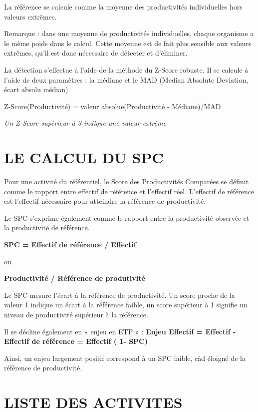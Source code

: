 \documentclass[
]{book}
\begin{document}
La référence se calcule comme la moyenne des productivités individuelles hors valeurs extrêmes.

Remarque : dans une moyenne de productivités individuelles, chaque organisme a le même poids dans le calcul. Cette moyenne est de fait plus sensible aux valeurs extrêmes, qu'il est donc nécessaire de détecter et d'éliminer.

La détection s'effectue à l'aide de la méthode du Z-Score robuste.
Il se calcule à l'aide de deux paramètres : la médiane et le MAD (Median Absolute Deviation, écart absolu médian).

Z-Score(Productivité) = valeur absolue(Productivité - Médiane)/MAD

\emph{Un Z-Score supérieur à 3 indique une valeur extrême}

\hypertarget{le-calcul-du-spc-5}{%
\section{LE CALCUL DU SPC}\label{le-calcul-du-spc-5}}

Pour une activité du référentiel, le Score des Productivités Comparées se définit comme le rapport entre effectif de référence et l'effectif réel. L'effectif de référence est l'effectif nécessaire pour atteindre la référence de productivité.

Le SPC s'exprime également comme le rapport entre la productivité observée et la productivité de référence.

\textbf{SPC = Effectif de référence / Effectif}

ou

\textbf{Productivité / Référence de produtivité}

Le SPC mesure l'écart à la référence de productivité. Un score proche de la valeur 1 indique un écart à la référence faible, un score supérieur à 1 signifie un niveau de productivité supérieur à la référence.

Il se décline également en « enjeu en ETP » :
\textbf{Enjeu Effectif = Effectif - Effectif de référence = Effectif ( 1- SPC)}

Ainsi, un enjeu largement positif correspond à un SPC faible, càd éloigné de la référence de productivité.

\hypertarget{liste-des-activites-2}{%
\section{LISTE DES ACTIVITES}\label{liste-des-activites-2}}
\end{document}
